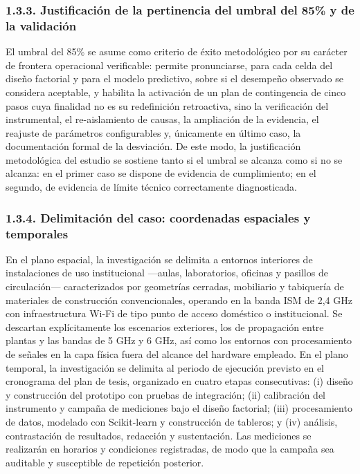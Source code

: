 \documentclass[
  12pt,
]{article}
\begin{document}
\subsubsection{1.3.3. Justificación de la pertinencia del umbral del
85\% y de la
validación}\label{justificaciuxf3n-de-la-pertinencia-del-umbral-del-85-y-de-la-validaciuxf3n}

El umbral del 85\% se asume como criterio de éxito metodológico por su
carácter de frontera operacional verificable: permite pronunciarse, para
cada celda del diseño factorial y para el modelo predictivo, sobre si el
desempeño observado se considera aceptable, y habilita la activación de
un plan de contingencia de cinco pasos cuya finalidad no es su
redefinición retroactiva, sino la verificación del instrumental, el
re-aislamiento de causas, la ampliación de la evidencia, el reajuste de
parámetros configurables y, únicamente en último caso, la documentación
formal de la desviación. De este modo, la justificación metodológica del
estudio se sostiene tanto si el umbral se alcanza como si no se alcanza:
en el primer caso se dispone de evidencia de cumplimiento; en el
segundo, de evidencia de límite técnico correctamente diagnosticada.

\subsubsection{1.3.4. Delimitación del caso: coordenadas espaciales y
temporales}\label{delimitaciuxf3n-del-caso-coordenadas-espaciales-y-temporales}

En el plano espacial, la investigación se delimita a entornos interiores
de instalaciones de uso institucional —aulas, laboratorios, oficinas y
pasillos de circulación— caracterizados por geometrías cerradas,
mobiliario y tabiquería de materiales de construcción convencionales,
operando en la banda ISM de 2,4 GHz con infraestructura Wi-Fi de tipo
punto de acceso doméstico o institucional. Se descartan explícitamente
los escenarios exteriores, los de propagación entre plantas y las bandas
de 5 GHz y 6 GHz, así como los entornos con procesamiento de señales en
la capa física fuera del alcance del hardware empleado. En el plano
temporal, la investigación se delimita al periodo de ejecución previsto
en el cronograma del plan de tesis, organizado en cuatro etapas
consecutivas: (i) diseño y construcción del prototipo con pruebas de
integración; (ii) calibración del instrumento y campaña de mediciones
bajo el diseño factorial; (iii) procesamiento de datos, modelado con
Scikit-learn y construcción de tableros; y (iv) análisis, contrastación
de resultados, redacción y sustentación. Las mediciones se realizarán en
horarios y condiciones registradas, de modo que la campaña sea auditable
y susceptible de repetición posterior.
\end{document}

